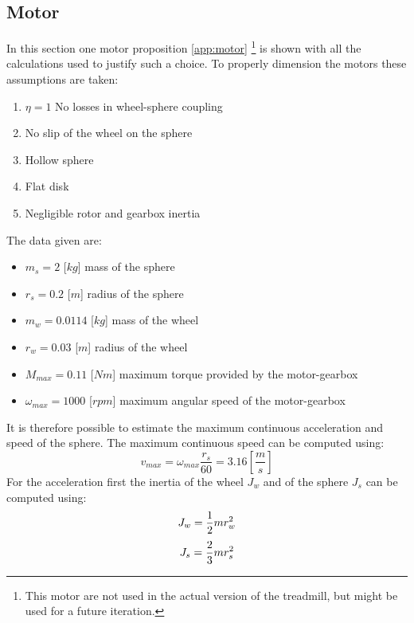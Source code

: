 \documentclass[12pt,a4paper, twoside]{article}
\begin{document}
\subsection{Motor}
In this section one motor proposition \ref{app:motor} \footnote{This motor are not used in the actual version of the treadmill, but might be used for a future iteration.} is shown with all the calculations used to justify such a choice.
To properly dimension the motors these assumptions are taken:
\begin{multicols}{2}[]
\begin{enumerate}
	\item $\eta = 1$ No losses in wheel-sphere coupling
	\item No slip of the wheel on the sphere
	\item Hollow sphere
	\item Flat disk
	\item Negligible rotor and gearbox inertia 
\end{enumerate}
\end{multicols}
The data given are:
\begin{multicols}{2}[]
\begin{itemize}
	\item $m_s = 2$ [$kg$] mass of the sphere
	\item $r_s = 0.2$ [$m$] radius of the sphere
	\item $m_w = 0.0114$ [$kg$] mass of the wheel
	\item $r_w = 0.03$ [$m$] radius of the wheel
	\item $M_{max} = 0.11$ [$Nm$] maximum torque provided by the motor-gearbox 
	\item $\omega_{max} = 1000$ [$rpm$] maximum angular speed of the motor-gearbox
\end{itemize}
\end{multicols}

It is therefore possible to estimate the maximum continuous acceleration and speed of the sphere.
The maximum continuous speed can be computed using:
\begin{equation}
	v_{max} = \omega_{max}\frac{r_s}{60} = 3.16 [\frac{m}{s}]
\end{equation} 
For the acceleration first the inertia of the wheel $J_w$ and of the sphere $J_s$ can be computed using:
\begin{equation}
J_w = \frac{1}{2}mr_w^2\\
\end{equation}
\begin{equation}
J_s = \frac{2}{3}mr_s^2\\
\end{equation}
\end{document}
